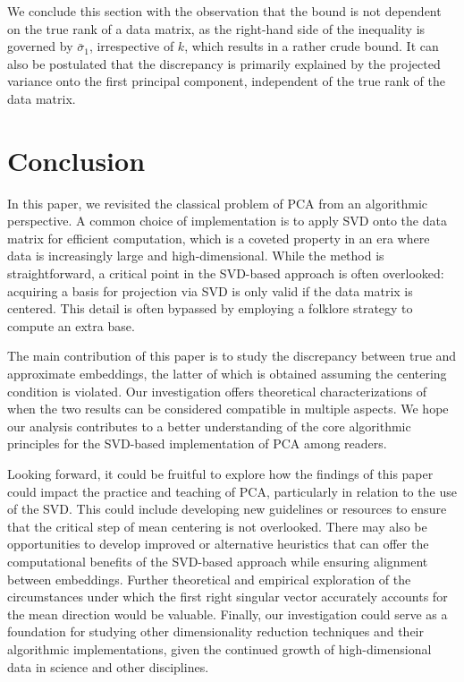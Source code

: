 \documentclass[11pt]{article}
\begin{document}
We conclude this section with the observation that the bound is not dependent on the true rank of a data matrix, as the right-hand side of the inequality is governed by $\bar{\sigma}_1$, irrespective of $k$, which results in a rather crude bound. It can also be postulated that the discrepancy is primarily explained by the projected variance onto the first principal component, independent of the true rank of the data matrix.




\section{Conclusion}\label{sec:conclusion}



In this paper, we revisited the classical problem of PCA from an algorithmic perspective. A common choice of implementation is to apply SVD onto the data matrix for efficient computation, which is a coveted property in an era where data is increasingly large and high-dimensional. While the method is straightforward, a critical point in the SVD-based approach is often overlooked: acquiring a basis for projection via SVD is only valid if the data matrix is centered. This detail is often bypassed by employing a folklore strategy to compute an extra base.

The main contribution of this paper is to study the discrepancy between true and approximate embeddings, the latter of which is obtained assuming the centering condition is violated. Our investigation offers theoretical characterizations of when the two results can be considered compatible in multiple aspects. We hope our analysis contributes to a better understanding of the core algorithmic principles for the SVD-based implementation of PCA among readers.


Looking forward, it could be fruitful to explore how the findings of this paper could impact the practice and teaching of PCA, particularly in relation to the use of the SVD. This could include developing new guidelines or resources to ensure that the critical step of mean centering is not overlooked. There may also be opportunities to develop improved or alternative heuristics that can offer the computational benefits of the SVD-based approach while ensuring alignment between embeddings. Further theoretical and empirical exploration of the circumstances under which the first right singular vector accurately accounts for the mean direction would be valuable. Finally, our investigation could serve as a foundation for studying other dimensionality reduction techniques and their algorithmic implementations, given the continued growth of high-dimensional data in science and other disciplines.
\end{document}
